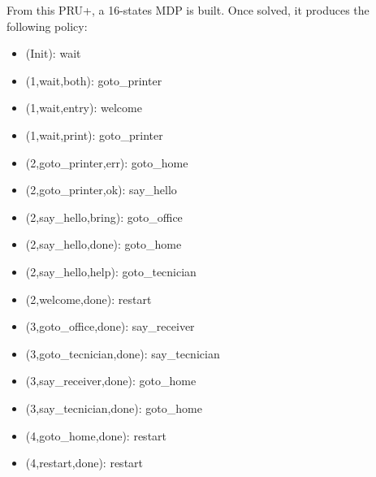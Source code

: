 %

From this PRU+, a 16-states MDP is built. %
Once solved, it produces the following policy:
\begin{multicols}{2}
  \begin{small}
    \begin{itemize}
    \item (Init): wait
    \item (1,wait,both): goto\_printer
    \item (1,wait,entry): welcome
    \item (1,wait,print): goto\_printer
    \item (2,goto\_printer,err): goto\_home
    \item (2,goto\_printer,ok): say\_hello
    \item (2,say\_hello,bring): goto\_office
    \item (2,say\_hello,done): goto\_home
    \item (2,say\_hello,help): goto\_tecnician
    \item (2,welcome,done): restart
    \item (3,goto\_office,done): say\_receiver
    \item (3,goto\_tecnician,done): say\_tecnician
    \item (3,say\_receiver,done): goto\_home
    \item (3,say\_tecnician,done): goto\_home
    \item (4,goto\_home,done): restart
    \item (4,restart,done): restart
    \end{itemize}
  \end{small}
\end{multicols}

